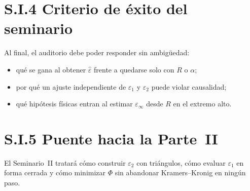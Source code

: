 \section*{S.I.4 Criterio de \'exito del seminario}

Al final, el auditorio debe poder responder sin ambig\"uedad:
\begin{itemize}[leftmargin=*]
\item qu\'e se gana al obtener $\hat\varepsilon$ frente a quedarse solo con $R$ o $\alpha$;
\item por qu\'e un ajuste independiente de $\varepsilon_1$ y $\varepsilon_2$ puede violar causalidad;
\item qu\'e hip\'otesis f\'isicas entran al estimar $\varepsilon_\infty$ desde $R$ en el extremo alto.
\end{itemize}

\section*{S.I.5 Puente hacia la Parte~II}

El Seminario~II tratar\'a c\'omo construir $\varepsilon_2$ con tri\'angulos, c\'omo evaluar $\varepsilon_1$ en forma cerrada y c\'omo minimizar $\Phi$ sin abandonar Kramers--Kronig en ning\'un paso.
